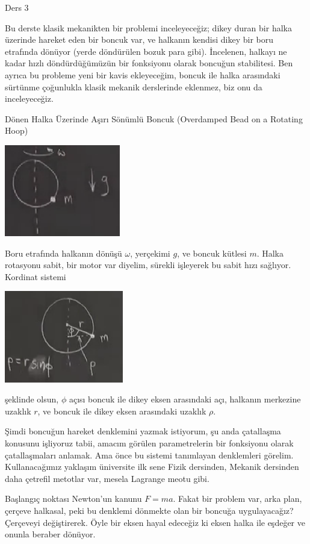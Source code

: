 \documentclass[12pt,fleqn]{article}\usepackage{../../common}
\begin{document}
Ders 3

Bu derste klasik mekanikten bir problemi inceleyeceğiz; dikey duran bir halka
üzerinde hareket eden bir boncuk var, ve halkanın kendisi dikey bir boru
etrafında dönüyor (yerde döndürülen bozuk para gibi). İncelenen, halkayı ne
kadar hızlı döndürdüğümüzün bir fonksiyonu olarak boncuğun stabilitesi. Ben
ayrıca bu probleme yeni bir kavis ekleyeceğim, boncuk ile halka arasındaki
sürtünme çoğunlukla klasik mekanik derslerinde eklenmez, biz onu da
inceleyeceğiz. 

Dönen Halka Üzerinde Aşırı Sönümlü Boncuk (Overdamped Bead on a Rotating Hoop)

\includegraphics[height=4cm]{03_01.png}

Boru etrafında halkanın dönüşü $\omega$, yerçekimi $g$, ve boncuk kütlesi
$m$. Halka rotasyonu sabit, bir motor var diyelim, sürekli işleyerek bu sabit
hızı sağlıyor. Kordinat sistemi

\includegraphics[height=4cm]{03_02.png}

şeklinde olsun, $\phi$ açısı boncuk ile dikey eksen arasındaki açı, halkanın
merkezine uzaklık $r$, ve boncuk ile dikey eksen arasındaki uzaklık $\rho$. 

Şimdi boncuğun hareket denklemini yazmak istiyorum, şu anda çatallaşma konusunu
işliyoruz tabii, amacım görülen parametrelerin bir fonksiyonu olarak
çatallaşmaları anlamak. Ama önce bu sistemi tanımlayan denklemleri
görelim. Kullanacağımız yaklaşım üniversite ilk sene Fizik dersinden, Mekanik
dersinden daha çetrefil metotlar var, mesela Lagrange meotu gibi.

Başlangıç noktası Newton'un kanunu $F=ma$. Fakat bir problem var, arka plan,
çerçeve halkasal, peki bu denklemi dönmekte olan bir boncuğa uygulayacağız?
Çerçeveyi değiştirerek. Öyle bir eksen hayal edeceğiz ki eksen halka ile eşdeğer
ve onunla beraber dönüyor.
\end{document}
